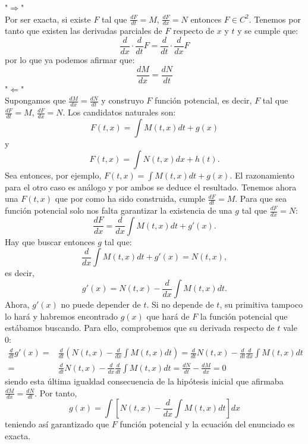 \documentclass[11pt, a4paper,twoside]{article}
\makeatletter
\theoremstyle{theorem-style}  %
\renewenvironment{proof}[1][\proofname]{\par
	\pushQED{\qed}%
	\normalfont \topsep6\p@\@plus6\p@\relax
	\list{}{%
		\settowidth{\leftmargin}{\quad:\hskip\labelsep}%
		\setlength{\labelwidth}{0pt}%
		\setlength{\itemindent}{-\leftmargin}%
	}%
	\item[\hskip\labelsep\itshape#1\@addpunct{:}]\ignorespaces
}{%
	\popQED\endlist\@endpefalse
}
\theoremstyle{definition-style}
\theoremstyle{example-style}
\makeatother
\begin{document}
\begin{proof}
	"$\Rightarrow$" \\
	Por ser exacta, si existe $F$ tal que $\frac{dF}{dt} = M$, $\frac{dF}{dx} = N$ entonces $F \in C^2$. Tenemos por tanto que existen las derivadas parciales de $F$ respecto de $x$ y $t$ y se cumple que:
	\[ \frac{d}{dx} \cdot \frac{d}{dt} F = \frac{d}{dt} \cdot \frac{d}{dx} F\]
	por lo que ya podemos afirmar que:
	\[\frac{dM}{dx} = \frac{dN}{dt}\]
	"$\Leftarrow$" \\
	Supongamos que $\frac{dM}{dx} = \frac{dN}{dt}$  y construyo $F$ función potencial, es decir, $F$ tal que $\frac{dF}{dt} = M$, $\frac{dF}{dx} = N$. Los candidatos naturales son:
	\[F(t,x)=\int M(t, x)dt + g(x)\]
	y
	\[F(t,x)=\int N(t, x)dx + h(t).\]
	Sea entonces, por ejemplo, $F(t, x) = \int M(t, x)dt + g(x)$. El razonamiento para el otro caso es análogo y por ambos se deduce el resultado. Tenemos ahora una $ F(t,x) $ que por como ha sido construida, cumple $\frac{dF}{dt} = M$. Para que sea función potencial solo nos falta garantizar la existencia de una $g$ tal que $\frac{dF}{dx} = N$:
	\[\frac{dF}{dx} = \frac{d}{dx}\int M(t, x)dt + g'(x).\]
	Hay que buscar entonces $g$ tal que:
	\[\frac{d}{dx}\int M(t, x)dt + g'(x) = N(t, x),\]
	es decir, 
	\[g'(x) = N(t, x) - \frac{d}{dx}\int M(t, x)dt.\]
	Ahora, $ g'(x) $ no puede depender de $ t $. Si no depende de $ t $, su primitiva tampoco lo hará y habremos encontrado $g(x)  $ que hará de $ F $ la función potencial que estábamos buscando. Para ello, comprobemos que su derivada respecto de $ t $ vale 0:
	\begin{align*}
	\frac{d}{dt} g'(x)=	& \frac{d}{dt}\left( N(t, x) - \frac{d}{dx}\int M(t, x)dt\right)  =  \frac{d}{dt}N(t, x) -  \frac{d}{dt}\frac{d}{dx}\int M(t, x)dt  \\
		=& \frac{d}{dt}N(t, x) -  \frac{d}{dx}\frac{d}{dt}\int M(t, x)dt = 
		\frac{dN}{dt} - \frac{dM}{dx} = 0
	\end{align*}
	siendo esta última igualdad consecuencia de la hipótesis inicial que afirmaba $\frac{dM}{dx} = \frac{dN}{dt}$. Por tanto, 
	\[g(x) = \int\left[ N(t, x) - \frac{d}{dx}\int M(t, x)dt\right] dx\]
	teniendo así garantizado que $F$ función potencial y la ecuación del enunciado es exacta.
\end{proof}
\end{document}
